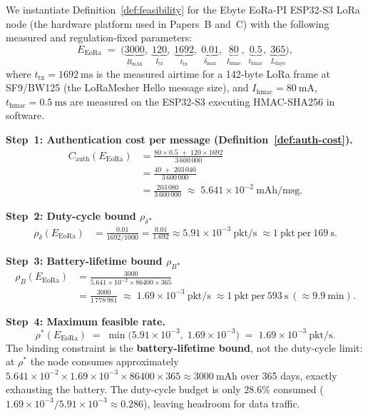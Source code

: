 \begin{example}
\label{ex:eora-pi}
We instantiate Definition~\ref{def:feasibility} for the Ebyte EoRa-PI
ESP32-S3 LoRa node (the hardware platform used in Papers~B and~C) with
the following measured and regulation-fixed parameters:
\[
  E_{\mathrm{EoRa}} \;=\;
  \bigl(
    \underbrace{3000}_{\textstyle B_{\mathrm{mAh}}},\;
    \underbrace{120}_{\textstyle I_{\mathrm{tx}}},\;
    \underbrace{1692}_{\textstyle t_{\mathrm{tx}}},\;
    \underbrace{0.01}_{\textstyle \delta_{\max}},\;
    \underbrace{80}_{\textstyle I_{\mathrm{hmac}}},\;
    \underbrace{0.5}_{\textstyle t_{\mathrm{hmac}}},\;
    \underbrace{365}_{\textstyle L_{\mathrm{days}}}
  \bigr),
\]
where $t_{\mathrm{tx}} = 1692\ \mathrm{ms}$ is the measured airtime for a
142-byte LoRa frame at SF9/BW125 (the LoRaMesher Hello message size), and
$I_{\mathrm{hmac}} = 80\ \mathrm{mA}$, $t_{\mathrm{hmac}} = 0.5\ \mathrm{ms}$
are measured on the ESP32-S3 executing HMAC-SHA256 in software.

\medskip
\noindent\textbf{Step~1: Authentication cost per message (Definition~\ref{def:auth-cost}).}
\begin{align*}
  C_{\mathrm{auth}}(E_{\mathrm{EoRa}})
  &= \frac{80 \times 0.5 \;+\; 120 \times 1692}{3\,600\,000} \\
  &= \frac{40 \;+\; 203\,040}{3\,600\,000} \\
  &= \frac{203\,080}{3\,600\,000}
  \;\approx\; 5.641 \times 10^{-2}\ \mathrm{mAh/msg}.
\end{align*}

\medskip
\noindent\textbf{Step~2: Duty-cycle bound $\rho_\delta$.}
\begin{align*}
  \rho_{\delta}(E_{\mathrm{EoRa}})
  &= \frac{0.01}{1692/1000}
   = \frac{0.01}{1.692}
   \approx 5.91 \times 10^{-3}\ \mathrm{pkt/s}
   \;\approx 1\ \mathrm{pkt\ per\ 169\ s.}
\end{align*}

\medskip
\noindent\textbf{Step~3: Battery-lifetime bound $\rho_B$.}
\begin{align*}
  \rho_{B}(E_{\mathrm{EoRa}})
  &= \frac{3000}{5.641\times10^{-2} \times 86400 \times 365} \\
  &= \frac{3000}{1\,778\,981}
   \;\approx\; 1.69 \times 10^{-3}\ \mathrm{pkt/s}
   \;\approx 1\ \mathrm{pkt\ per\ 593\ s\ (\approx 9.9\ min).}
\end{align*}

\medskip
\noindent\textbf{Step~4: Maximum feasible rate.}
\[
  \rho^*(E_{\mathrm{EoRa}})
  \;=\; \min\!\bigl(5.91 \times 10^{-3},\; 1.69 \times 10^{-3}\bigr)
  \;=\; 1.69 \times 10^{-3}\ \mathrm{pkt/s}.
\]
The binding constraint is the \textbf{battery-lifetime bound}, not the
duty-cycle limit: at $\rho^*$ the node consumes approximately
$5.641 \times 10^{-2} \times 1.69 \times 10^{-3} \times 86400 \times 365
\approx 3000\ \mathrm{mAh}$ over 365 days, exactly exhausting the
battery.  The duty-cycle budget is only $28.6\%$ consumed
($1.69 \times 10^{-3} / 5.91 \times 10^{-3} \approx 0.286$), leaving
headroom for data traffic.


\end{example}
